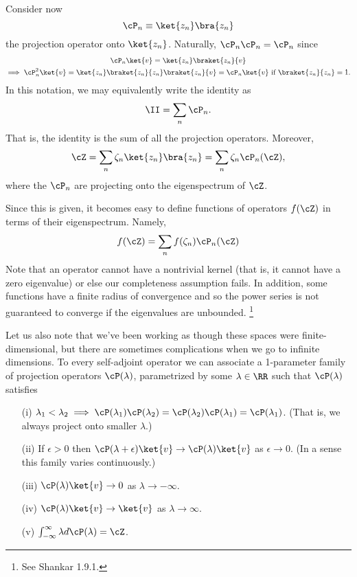 Consider now
\begin{equation}
    \cP_n \equiv \ket{z_n}\bra{z_n}
\end{equation}
the projection operator onto $\ket{z_n}$. Naturally, $\cP_n \cP_n=\cP_n$ since
\begin{gather*}
    \cP_n \ket{v} = \ket{z_n} \braket{z_n}{v}\\
    \implies \cP_n^2 \ket{v} = \ket{z_n}\braket{z_n}{z_n}\braket{z_n}{v} = \cP_n \ket{v} \text{ if }\braket{z_n}{z_n}=1.
\end{gather*}
In this notation, we may equivalently write the identity as
\begin{equation}
    \II = \sum_n \cP_n.
\end{equation}
That is, the identity is the sum of all the projection operators. Moreover,
\begin{equation}
    \cZ = \sum_n \zeta_n \ket{z_n}\bra{z_n} = \sum_n \zeta_n \cP_n(\cZ),
\end{equation}
where the $\cP_n$ are projecting onto the eigenspectrum of $\cZ$.

Since this is given, it becomes easy to define functions of operators $f(\cZ)$ in terms of their eigenspectrum. Namely,
\begin{equation}
    f(\cZ)=\sum_n f(\zeta_n) \cP_n(\cZ)
\end{equation}
Note that an operator cannot have a nontrivial kernel (that is, it cannot have a zero eigenvalue) or else our completeness assumption fails. In addition, some functions have a finite radius of convergence and so the power series is not guaranteed to converge if the eigenvalues are unbounded.%
    \footnote{See Shankar 1.9.1.}

Let us also note that we've been working as though these spaces were finite-dimensional, but there are sometimes complications when we go to infinite dimensions. To every self-adjoint operator we can associate a 1-parameter family of projection operators $\cP(\lambda)$, parametrized by some $\lambda\in \RR$ such that $\cP(\lambda)$ satisfies
\begin{enumerate}
    \item[(i)] $\lambda_1 <\lambda_2 \implies \cP(\lambda_1) \cP(\lambda_2) = \cP(\lambda_2) \cP(\lambda_1) = \cP(\lambda_1)$. (That is, we always project onto smaller $\lambda$.)
    \item[(ii)] If $\epsilon>0$ then $\cP(\lambda+\epsilon)\ket{v} \to \cP(\lambda)\ket{v}$ as $\epsilon\to 0$. (In a sense this family varies continuously.)
    \item[(iii)] $\cP(\lambda)\ket{v}\to 0$ as $\lambda \to -\infty$.
    \item[(iv)] $\cP(\lambda)\ket{v}\to \ket{v}$ as $\lambda\to \infty$.
    \item[(v)] $\int_{-\infty}^\infty \lambda d\cP(\lambda)=\cZ$.
\end{enumerate}

